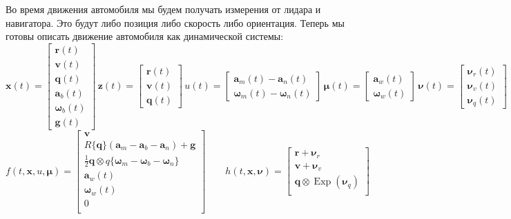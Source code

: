 \documentclass[12pt]{article}
\begin{document}
Во время движения автомобиля мы будем получать измерения от лидара и навигатора.
Это будут либо позиция либо скорость либо ориентация. Теперь мы готовы описать
движение автомобиля как динамической системы:
\begin{equation}
    \pmb{x}(t)=\begin{bmatrix}
        \pmb{r}(t)   \\ \pmb{v}(t) \\ \pmb{q}(t) \\
        \pmb{a}_b(t) \\ \pmb{\omega}_b(t) \\ \pmb{g}(t)
    \end{bmatrix}
    \,
    \pmb{z}(t)=\begin{bmatrix}
        \pmb{r}(t) \\ \pmb{v}(t) \\ \pmb{q}(t)
    \end{bmatrix}
    \,
    u(t)=\begin{bmatrix}
        \pmb{a}_m(t) - \pmb{a}_n(t) \\
        \pmb{\omega}_m(t) - \pmb{\omega}_n(t)
    \end{bmatrix}
    \,
    \pmb{\mu}(t)=\begin{bmatrix}
        \pmb{a}_w(t) \\ \pmb{\omega}_w(t)
    \end{bmatrix}
    \,
    \pmb{\nu}(t)=\begin{bmatrix}
        \pmb{\nu}_r(t) \\ \pmb{\nu}_v(t) \\ \pmb{\nu}_q(t)
    \end{bmatrix}
\end{equation}
\begin{equation}
    f(t,\pmb{x},u,\pmb{\mu})=\begin{bmatrix}
        \pmb{v}                                                    \\
        R\{\pmb{q}\} (\pmb{a}_m - \pmb{a}_b - \pmb{a}_n) + \pmb{g} \\
        \frac{1}{2} \pmb{q} \otimes q\{
        \pmb{\omega}_m - \pmb{\omega}_b - \pmb{\omega}_n
        \}                                                         \\
        \pmb{a}_w(t)                                               \\
        \pmb{\omega}_w(t)                                          \\
        0                                                          \\
    \end{bmatrix}
    \qquad
    h(t,\pmb{x},\pmb{\nu})=\begin{bmatrix}
        \pmb{r} + \pmb{\nu}_r                           \\
        \pmb{v} + \pmb{\nu}_v                           \\
        \pmb{q} \otimes \operatorname{Exp}(\pmb{\nu}_q) \\
    \end{bmatrix}
\end{equation}
\end{document}
